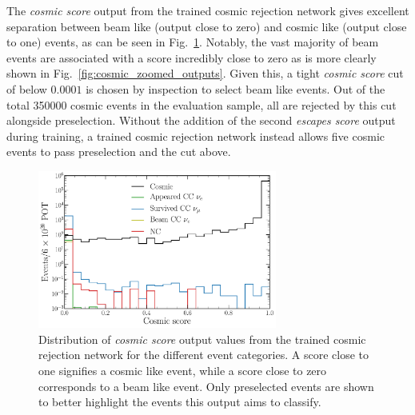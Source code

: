 The \emph{cosmic score} output from the trained cosmic rejection network gives excellent
separation between beam like (output close to zero) and cosmic like (output close to one) events,
as can be seen in Fig.~\ref{fig:cosmic_outputs}. Notably, the vast majority of beam events are
associated with a score incredibly close to zero as is more clearly shown in
Fig.~\ref{fig:cosmic_zoomed_outputs}. Given this, a tight \emph{cosmic score} cut of below
$0.0001$ is chosen by inspection to select beam like events. Out of the total 350000 cosmic events
in the evaluation sample, all are rejected by this cut alongside preselection. Without the
addition of the second \emph{escapes score} output during training, a trained cosmic rejection
network instead allows five cosmic events to pass preselection and the cut above.

\begin{figure} %
    \includegraphics[width=0.7\textwidth]{diagrams/7-results/final_cosmic_outputs.pdf}
    \caption[Distribution of cosmic score output values]
    {Distribution of \emph{cosmic score} output values from the trained cosmic rejection network
        for the different event categories. A score close to one signifies a cosmic like event,
        while a score close to zero corresponds to a beam like event. Only preselected events are
        shown to better highlight the events this output aims to classify.}
    \label{fig:cosmic_outputs}
\end{figure}

